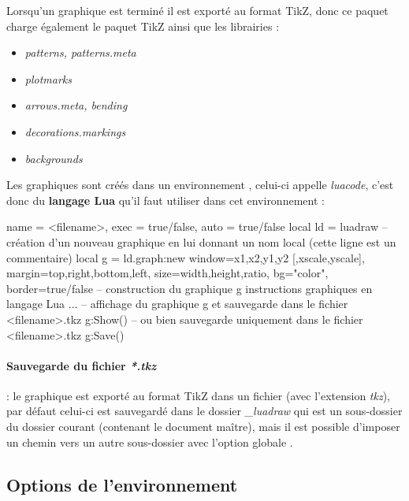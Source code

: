 Lorsqu'un graphique est terminé il est exporté au format TikZ, donc ce paquet charge également le paquet TikZ ainsi que les librairies :
\begin{itemize}
\item\emph{patterns, patterns.meta}
\item\emph{plotmarks}
\item\emph{arrows.meta, bending}
\item\emph{decorations.markings}
\item\emph{backgrounds}
\end{itemize}

Les graphiques sont créés dans un environnement \luadrawenv, celui-ci appelle \emph{luacode}, c'est donc du \textbf{langage Lua} qu'il faut utiliser dans cet environnement :

\begin{TeXcode}
\begin{luadraw}{ name = <filename>, exec = true/false, auto = true/false }
local ld = luadraw
-- création d'un nouveau graphique en lui donnant un nom local (cette ligne est un commentaire)
local g = ld.graph:new{ window={x1,x2,y1,y2 [,xscale,yscale]}, margin={top,right,bottom,left},
                     size={width,height,ratio}, bg="color", border=true/false }
-- construction du graphique g
    instructions graphiques en langage Lua ...
-- affichage du graphique g et sauvegarde dans le fichier <filename>.tkz
g:Show()
-- ou bien sauvegarde uniquement dans le fichier <filename>.tkz
g:Save()
\end{luadraw}
\end{TeXcode}

\paragraph{Sauvegarde du fichier \emph{*.tkz}} : le graphique est exporté au format TikZ dans un fichier (avec l'extension \emph{tkz}), par défaut celui-ci est sauvegardé dans le dossier \emph{\_luadraw} qui est un sous-dossier du dossier courant (contenant le document maître), mais il est possible d'imposer un chemin vers un autre sous-dossier avec l'option globale .

\subsection{Options de l'environnement \luadrawenv}

